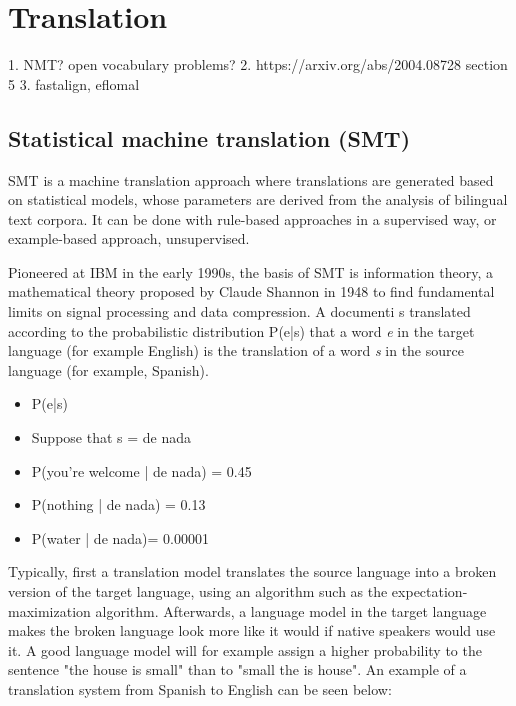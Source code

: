 %
%

\chapter{Translation}\label{ch:translation}

	1. NMT? open vocabulary problems?
	2. https://arxiv.org/abs/2004.08728 section 5
 	3. fastalign, eflomal

\section{Statistical machine translation (SMT)}

SMT is a machine translation approach where translations are generated based on statistical models, whose parameters are derived from the analysis of bilingual text corpora. It can be done with rule-based approaches in a supervised way, or example-based approach, unsupervised.

Pioneered at IBM in the early 1990s, the basis of SMT is information theory, a mathematical theory proposed by Claude Shannon in 1948 to find fundamental limits on signal processing and data compression. A documenti s translated according to the probabilistic distribution P(e|s) that a word \emph{e} in the target language (for example English) is the translation of a word \emph{s} in the source language (for example, Spanish).

\begin{itemize}
	\item P(e|s)
	\item Suppose that s = de nada
	\item P(you're welcome | de nada) = 0.45
	\item P(nothing | de nada) = 0.13
	\item P(water | de nada)= 0.00001
\end{itemize}

Typically, first a translation model translates the source language into a broken version of the target language, using an algorithm such as the expectation-maximization algorithm. Afterwards, a language model in the target language makes the broken language look more like it would if native speakers would use it. A good language model will for example assign a higher probability to the sentence "the house is small" than to "small the is house". An example of a translation system from Spanish to English can be seen below:

